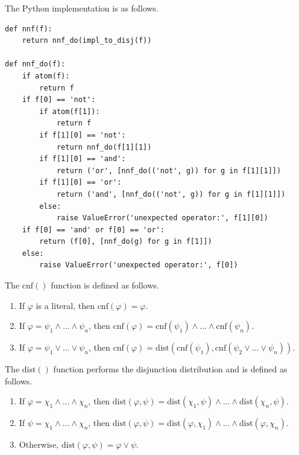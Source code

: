 \documentclass[a4paper,notitlepage]{scrartcl}
\let\phi\varphi
\begin{document}
\noindent
The Python implementation is as follows.

\begin{verbatim}
def nnf(f):
    return nnf_do(impl_to_disj(f))

def nnf_do(f):
    if atom(f):
        return f
    if f[0] == 'not':
        if atom(f[1]):
            return f
        if f[1][0] == 'not':
            return nnf_do(f[1][1])
        if f[1][0] == 'and':
            return ('or', [nnf_do(('not', g)) for g in f[1][1]])
        if f[1][0] == 'or':
            return ('and', [nnf_do(('not', g)) for g in f[1][1]])
        else:
            raise ValueError('unexpected operator:', f[1][0])
    if f[0] == 'and' or f[0] == 'or':
        return (f[0], [nnf_do(g) for g in f[1]])
    else:
        raise ValueError('unexpected operator:', f[0])
\end{verbatim}

The $\mathrm{cnf}()$ function is defined as follows.

\begin{enumerate}

\item
If $\phi$ is a literal, then $\mathrm{cnf}(\phi) = \phi$.

\item
If $\phi = \psi_1 \land \ldots \land \psi_n$, then $\mathrm{cnf}(\phi) =
\mathrm{cnf}(\psi_1) \land \ldots \land \mathrm{cnf}(\psi_n)$.

\item
If $\phi = \psi_1 \lor \ldots \lor \psi_n$, then $\mathrm{cnf}(\phi) =
\mathrm{dist}(\mathrm{cnf}(\psi_1), \mathrm{cnf}(\psi_2 \lor \ldots \lor
\psi_n))$.

\end{enumerate}

\noindent
The $\mathrm{dist}()$ function performs the disjunction distribution and is
defined as follows.

\begin{enumerate}

\item
If $\phi = \chi_1 \land \ldots \land \chi_n$, then $\mathrm{dist}(\phi, \psi) =
\mathrm{dist}(\chi_1, \psi) \land \ldots \land \mathrm{dist}(\chi_n, \psi)$.

\item
If $\psi = \chi_1 \land \ldots \land \chi_n$, then $\mathrm{dist}(\phi, \psi) =
\mathrm{dist}(\phi, \chi_1) \land \ldots \land \mathrm{dist}(\phi, \chi_n)$.

\item
Otherwise, $\mathrm{dist}(\phi, \psi) = \phi \lor \psi$.

\end{enumerate}
\end{document}

